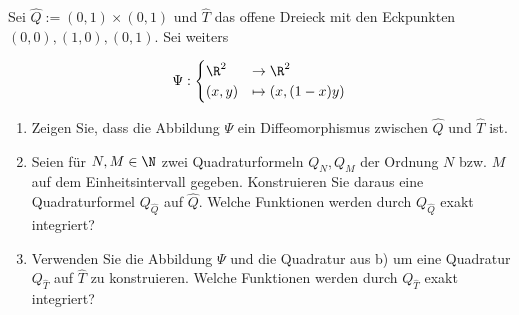 
\begin{exercise}

Sei $\hat{Q}:= (0,1) \times (0,1)$ und $\hat{T}$ das offene Dreieck mit den Eckpunkten
$(0,0),(1,0),(0,1)$. Sei weiters

\begin{align*}
  \Psi:
  \begin{cases}
    \R^2 &\rightarrow \R^2 \\
    (x,y) & \mapsto (x,(1-x)y)
  \end{cases}
\end{align*}

\begin{enumerate}[label = \textbf{\alph*)}]
  \item Zeigen Sie, dass die Abbildung $\Psi$ ein Diffeomorphismus zwischen $\hat{Q}$ und $\hat{T}$ ist.
  \item Seien für $N, M \in \N$ zwei Quadraturformeln $Q_N, Q_M$ der Ordnung $N$ bzw. $M$ auf dem
  Einheitsintervall gegeben. Konstruieren Sie daraus eine Quadraturformel $Q_{\hat{Q}}$ auf $\hat{Q}$.
  Welche Funktionen werden durch $Q_{\hat{Q}}$ exakt integriert?
  \item Verwenden Sie die Abbildung $\Psi$ und die Quadratur aus b) um eine Quadratur $Q_{\hat{T}}$ auf $\hat{T}$
  zu konstruieren. Welche Funktionen werden durch $Q_{\hat{T}}$ exakt integriert?
  \end{enumerate}
\end{exercise}


